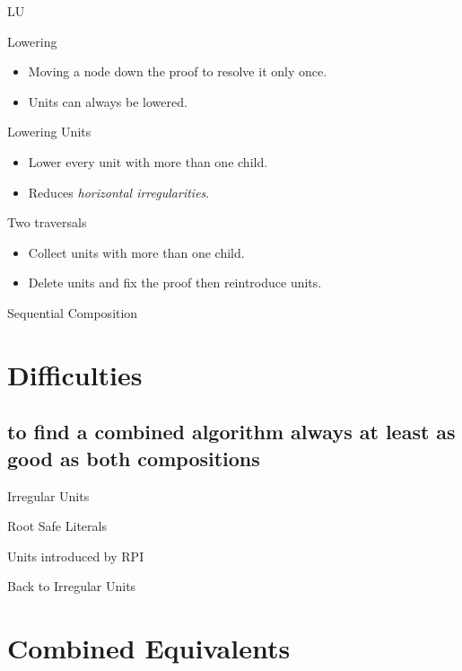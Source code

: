 \documentclass[compress]{beamer}
\newenvironment{subpart}[1]
{ \begin{block}{#1}
  \begin{itemize}
}{
  \end{itemize}
  \end{block}
}
\begin{document}
\begin{frame}{LU}
  \begin{subpart}{Lowering}
    \item Moving a node down the proof to resolve it only once.
    \item Units can always be lowered.
  \end{subpart}
  \begin{subpart}{Lowering Units}
    \item Lower every unit with more than one child.
    \item Reduces \emph{horizontal irregularities}.
  \end{subpart}
  \begin{subpart}{Two traversals}
    \item Collect units with more than one child.
    \item Delete units and fix the proof then reintroduce units.
  \end{subpart}
\end{frame}

\begin{frame}{Sequential Composition}
\centering

\end{frame}


\section{Difficulties}
\subsection{to find a combined algorithm always at least as good as both compositions}

\begin{frame}{Irregular Units}
\end{frame}

\begin{frame}{Root Safe Literals}
\end{frame}

\begin{frame}{Units introduced by RPI}
\end{frame}

\begin{frame}{Back to Irregular Units}
\end{frame}


\section{Combined Equivalents}
\end{document}
